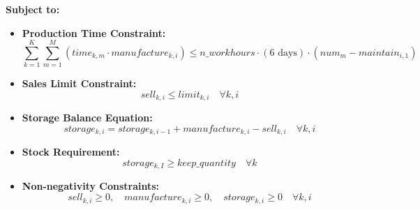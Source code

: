 \documentclass{article}
\begin{document}
\textbf{Subject to:}
\begin{itemize}
    \item \textbf{Production Time Constraint:}
    \[
    \sum_{k=1}^{K} \sum_{m=1}^{M} (time_{k, m} \cdot manufacture_{k, i}) \leq n\_workhours \cdot (6 \text{ days}) \cdot (num_{m} - maintain_{i, 1})
    \]
    \item \textbf{Sales Limit Constraint:}
    \[
    sell_{k, i} \leq limit_{k, i} \quad \forall k, i
    \]
    \item \textbf{Storage Balance Equation:}
    \[
    storage_{k, i} = storage_{k, i-1} + manufacture_{k, i} - sell_{k, i} \quad \forall k, i
    \]
    \item \textbf{Stock Requirement:}
    \[
    storage_{k, I} \geq keep\_quantity \quad \forall k
    \]
    \item \textbf{Non-negativity Constraints:}
    \[
    sell_{k, i} \geq 0, \quad manufacture_{k, i} \geq 0, \quad storage_{k, i} \geq 0 \quad \forall k, i
    \]
\end{itemize}
\end{document}
